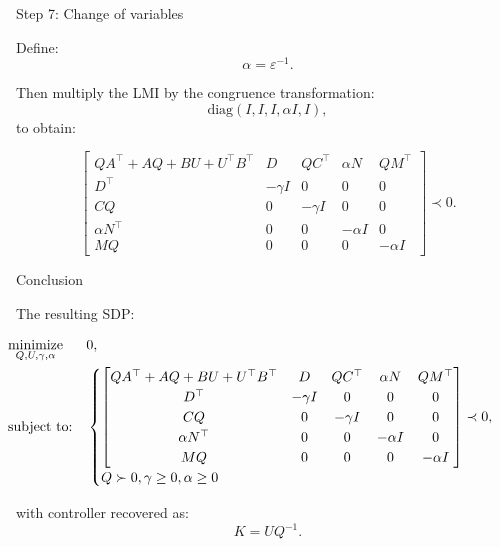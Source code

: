 \documentclass{beamer}
\begin{document}
\begin{frame}{Step 7: Change of variables}
	\begin{flushleft}
		
		Define:
		\[
		\alpha = \varepsilon^{-1}.
		\]
		
		Then multiply the LMI by the congruence transformation:
		\[
		\mathrm{diag}(I, I, I, \alpha I, I),
		\]
		to obtain:
		
		\[
		\begin{bmatrix}
			QA^\top + AQ + BU + U^\top B^\top
			& D
			& QC^\top
			& \alpha N
			& Q M^\top \\
			D^\top
			& -\gamma I
			& 0
			& 0
			& 0 \\
			CQ
			& 0
			& -\gamma I
			& 0
			& 0 \\
			\alpha N^\top
			& 0
			& 0
			& -\alpha I
			& 0 \\
			M Q
			& 0
			& 0
			& 0
			& -\alpha I
		\end{bmatrix}
		\prec 0.
		\]
		
	\end{flushleft}
\end{frame}



\begin{frame}{Conclusion}
	\begin{flushleft}
		
		{\small 
		The resulting SDP:
		
		
		\begin{equation}
			\label{robust_stability_sdp}
			\hspace*{-0.5cm} 
			\begin{aligned}
				& \underset{Q, U, \gamma, \alpha}{\text{minimize}} 
				& &  0, \\
				& \text{subject to:} & & 
				\begin{cases}
					\begin{bmatrix}
						QA^\top + AQ + BU + U^\top B^\top
						& D
						& QC^\top
						& \alpha N
						& Q M^\top \\
						D^\top
						& -\gamma I
						& 0
						& 0
						& 0 \\
						CQ
						& 0
						& -\gamma I
						& 0
						& 0 \\
						\alpha N^\top
						& 0
						& 0
						& -\alpha I
						& 0 \\
						M Q
						& 0
						& 0
						& 0
						& -\alpha I
					\end{bmatrix}
					\prec 0, \\ 
					Q \succ 0, 
					\gamma \geq 0, \alpha \geq 0
				\end{cases}
			\end{aligned}
		\end{equation}
		
		
		with controller recovered as:
		\[
		K = U Q^{-1}.
		\]
		
	}
	\end{flushleft}
\end{frame}


\myqrframe
\end{document}

